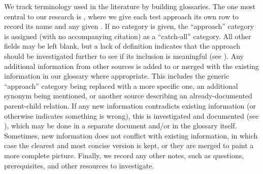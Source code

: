 We track terminology used in the literature by building glossaries. The one
most central to our research is \ourApproachGlossary{}, where we give each
test approach its own row to record its name and any given \approachFields{}.
If no category is given, the ``approach'' category is assigned
(with no accompanying citation) as a ``catch-all'' category. All other fields
may be left blank, but a lack of definition indicates that the approach should
be investigated further to see if its inclusion is meaningful (see
). Any additional information from other sources is added to
or merged with the existing information in our glossary where appropriate.
This includes the generic ``approach'' category being replaced with a more
specific one, an additional synonym being mentioned, or another source
describing an already-documented parent-child relation. If any new information
contradicts existing information (or otherwise indicates something is wrong),
this is investigated and documented (see ), which may be done
in a separate document and/or in the glossary itself. Sometimes, new
information does not conflict with existing information, in which case the
clearest and most concise version is kept, or they are merged to paint a more
complete picture. Finally, we record any other notes, such as questions,
prerequisites, and other resources to investigate.

